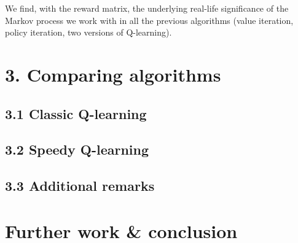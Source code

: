 \documentclass[a4paper, 12pt]{report}
\begin{document}
We find, with the reward matrix, the underlying real-life significance of the Markov process we work with in all the previous algorithms
(value iteration, policy iteration, two versions of Q-learning).


\chapter*{3. Comparing algorithms}

\section*{3.1 Classic Q-learning}

\section*{3.2 Speedy Q-learning}

\section*{3.3 Additional remarks}

\chapter*{Further work \& conclusion}



\end{document}
